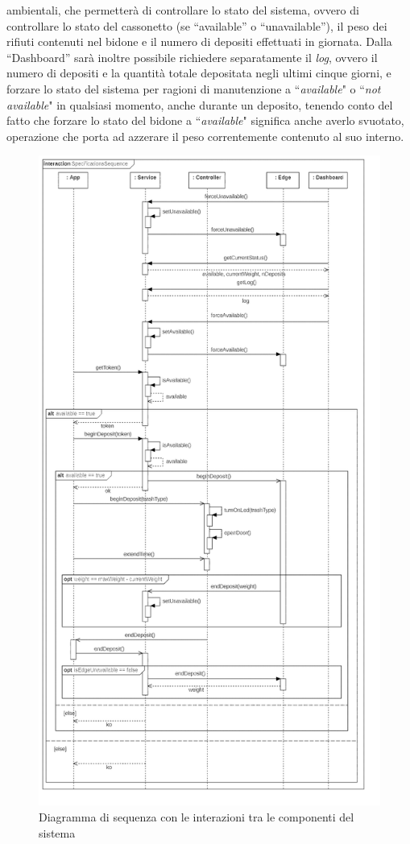 \documentclass[a4paper, 12pt]{report}
\begin{document}
	ambientali, che permetterà di controllare lo stato del sistema, ovvero di controllare lo stato del
	cassonetto (se ``available'' o ``unavailable''), il peso dei rifiuti contenuti nel bidone e il 
	numero di depositi effettuati in giornata. Dalla ``Dashboard'' sarà inoltre possibile richiedere separatamente il \textit{log},
	ovvero il numero di depositi e la quantità totale depositata negli ultimi cinque giorni, e
	forzare lo stato del sistema per ragioni di manutenzione a ``\textit{available}" o
	``\textit{not available}" in qualsiasi momento, anche durante un deposito, tenendo conto del fatto
	che forzare lo stato del bidone a ``\textit{available}" significa anche averlo svuotato, operazione che 
	porta ad azzerare il peso correntemente contenuto al suo interno.
	\begin{figure}[H]
		\centering
		\includegraphics[height=\textheight]{"img/Sequence"}    
		\caption{Diagramma di sequenza con le interazioni tra le componenti del sistema}
	\end{figure}
\end{document}
